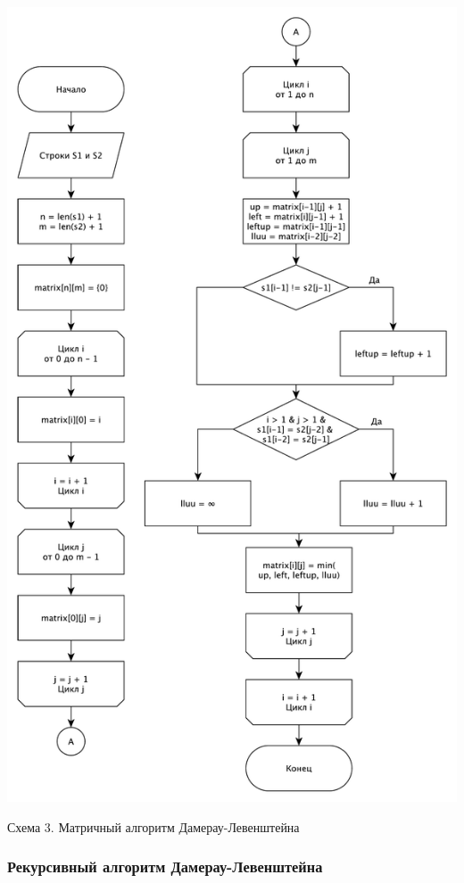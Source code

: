 \documentclass[a4paper,12pt]{article}
\begin{document}
\begin{center}
    \includegraphics[scale=0.6]{DLmatrix}

    Схема 3. Матричный алгоритм Дамерау-Левенштейна
\end{center}

\subsubsection{Рекурсивный алгоритм Дамерау-Левенштейна}
\end{document}
